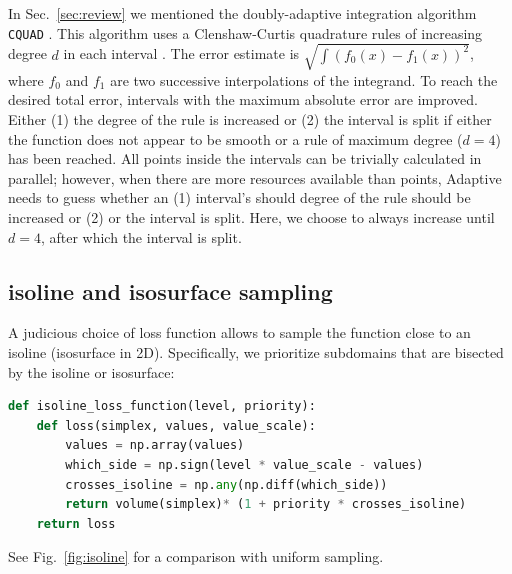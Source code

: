 \documentclass[english, twocolumn, 10pt, aps, superscriptaddress, floatfix, prb, citeautoscript]{revtex4-1}
\renewcommand{\citep}{\cite}
\newcommand{\passthrough}[1]{\lstset{mathescape=false}#1\lstset{mathescape=true}}
\begin{document}
In Sec.~\ref{sec:review} we mentioned the doubly-adaptive integration algorithm \passthrough{\lstinline!CQUAD!} \citep{Gonnet2010}.
This algorithm uses a Clenshaw-Curtis quadrature rules of increasing degree \(d\) in each interval \citep{Clenshaw1960}.
The error estimate is \(\sqrt{\int{\left(f_0(x) - f_1(x)\right)^2}}\), where \(f_0\) and \(f_1\) are two successive interpolations of the integrand.
To reach the desired total error, intervals with the maximum absolute error are improved.
Either (1) the degree of the rule is increased or (2) the interval is split if either the function does not appear to be smooth or a rule of maximum degree (\(d=4\)) has been reached.
All points inside the intervals can be trivially calculated in parallel; however, when there are more resources available than points, Adaptive needs to guess whether an (1) interval's should degree of the rule should be increased or (2) or the interval is split.
Here, we choose to always increase until \(d=4\), after which the interval is split.

\subsection{isoline and isosurface sampling}

A judicious choice of loss function allows to sample the function close to an isoline (isosurface in 2D). Specifically, we prioritize subdomains that are bisected by the isoline or isosurface:

\begin{lstlisting}[language=Python]
def isoline_loss_function(level, priority):
    def loss(simplex, values, value_scale):
        values = np.array(values)
        which_side = np.sign(level * value_scale - values)
        crosses_isoline = np.any(np.diff(which_side))
        return volume(simplex)* (1 + priority * crosses_isoline)
    return loss
\end{lstlisting}

See Fig.~\ref{fig:isoline} for a comparison with uniform sampling.
\end{document}
